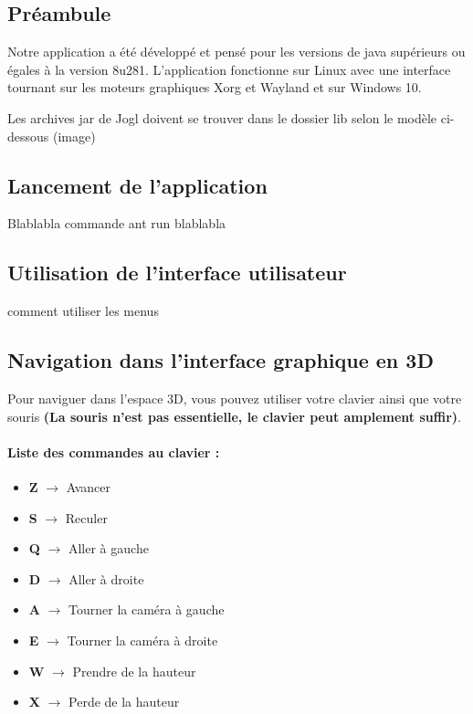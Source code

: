 \subsection{Préambule}
Notre application a été développé et pensé pour les versions de java supérieurs ou égales à la version 8u281.
L'application fonctionne sur Linux avec une interface tournant sur les moteurs graphiques Xorg et Wayland et sur Windows 10.

Les archives jar de Jogl doivent se trouver dans le dossier lib selon le modèle ci-dessous (image)


\subsection{Lancement de l'application}

Blablabla commande ant run blablabla

\subsection{Utilisation de l'interface utilisateur}

comment utiliser les menus

\subsection{Navigation dans l'interface graphique en 3D}

Pour naviguer dans l'espace 3D, vous pouvez utiliser votre clavier ainsi que votre souris \textbf{(La souris n'est pas essentielle, le clavier peut amplement suffir)}.

\paragraph{Liste des commandes au clavier : }
\begin{itemize}
    \item \textbf{Z} $\xrightarrow{}$ Avancer
    \item \textbf{S} $\xrightarrow{}$ Reculer
    \item \textbf{Q} $\xrightarrow{}$ Aller à gauche
    \item \textbf{D} $\xrightarrow{}$ Aller à droite
    \item \textbf{A} $\xrightarrow{}$ Tourner la caméra à gauche
    \item \textbf{E} $\xrightarrow{}$ Tourner la caméra à droite
    \item \textbf{W} $\xrightarrow{}$ Prendre de la hauteur
    \item \textbf{X} $\xrightarrow{}$ Perde de la hauteur
    \end{itemize}
